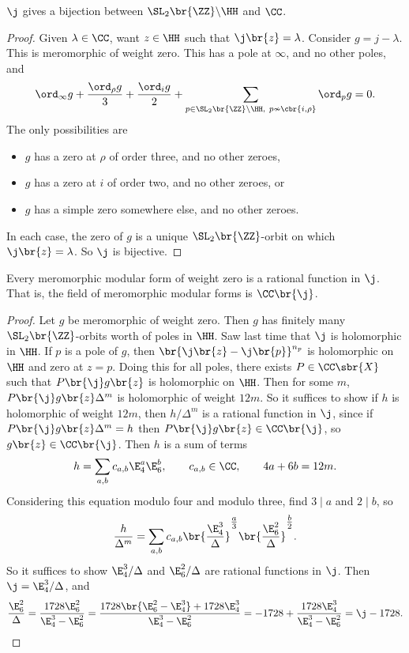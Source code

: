 \begin{theorem}
$ \j $ gives a bijection between $ \SL_2\br{\ZZ} \backslash \HH $ and $ \CC $.
\end{theorem}

\begin{proof}
Given $ \lambda \in \CC $, want $ z \in \HH $ such that $ \j\br{z} = \lambda $. Consider $ g = j - \lambda $. This is meromorphic of weight zero. This has a pole at $ \infty $, and no other poles, and
$$ \ord_\infty g + \dfrac{\ord_\rho g}{3} + \dfrac{\ord_i g}{2} + \sum_{p \in \SL_2\br{\ZZ} \backslash \HH, \ p \nsim \cbr{i, \rho}} \ord_p g = 0. $$
The only possibilities are
\begin{itemize}
\item $ g $ has a zero at $ \rho $ of order three, and no other zeroes,
\item $ g $ has a zero at $ i $ of order two, and no other zeroes, or
\item $ g $ has a simple zero somewhere else, and no other zeroes.
\end{itemize}
In each case, the zero of $ g $ is a unique $ \SL_2\br{\ZZ} $-orbit on which $ \j\br{z} = \lambda $. So $ \j $ is bijective.
\end{proof}


\begin{theorem}
Every meromorphic modular form of weight zero is a rational function in $ \j $. That is, the field of meromorphic modular forms is $ \CC\br{\j} $.
\end{theorem}

\begin{proof}
Let $ g $ be meromorphic of weight zero. Then $ g $ has finitely many $ \SL_2\br{\ZZ} $-orbits worth of poles in $ \HH $. Saw last time that $ \j $ is holomorphic in $ \HH $. If $ p $ is a pole of $ g $, then $ \br{\j\br{z} - \j\br{p}}^{n_p} $ is holomorphic on $ \HH $ and zero at $ z = p $. Doing this for all poles, there exists $ P \in \CC\sbr{X} $ such that $ P\br{\j}g\br{z} $ is holomorphic on $ \HH $. Then for some $ m $, $ P\br{\j}g\br{z}\Delta^m $ is holomorphic of weight $ 12m $. So it suffices to show if $ h $ is holomorphic of weight $ 12m $, then $ h / \Delta^m $ is a rational function in $ \j $, since if $ P\br{\j}g\br{z}\Delta^m = h $ then $ P\br{\j}g\br{z} \in \CC\br{\j} $, so $ g\br{z} \in \CC\br{\j} $. Then $ h $ is a sum of terms
$$ h = \sum_{a, b} c_{a, b}\E_4^a\E_6^b, \qquad c_{a, b} \in \CC, \qquad 4a + 6b = 12m. $$
Considering this equation modulo four and modulo three, find $ 3 \mid a $ and $ 2 \mid b $, so
$$ \dfrac{h}{\Delta^m} = \sum_{a, b} c_{a, b}\br{\dfrac{\E_4^3}{\Delta}}^{\tfrac{a}{3}}\br{\dfrac{\E_6^2}{\Delta}}^{\tfrac{b}{2}}. $$
So it suffices to show $ \E_4^3 / \Delta $ and $ \E_6^2 / \Delta $ are rational functions in $ \j $. Then $ \j = \E_4^3 / \Delta $, and
$$ \dfrac{\E_6^2}{\Delta} = \dfrac{1728\E_6^2}{\E_4^3 - \E_6^2} = \dfrac{1728\br{\E_6^2 - \E_4^3} + 1728\E_4^3}{\E_4^3 - \E_6^2} = -1728 + \dfrac{1728\E_4^3}{\E_4^3 - \E_6^2} = \j - 1728. $$
\end{proof}

